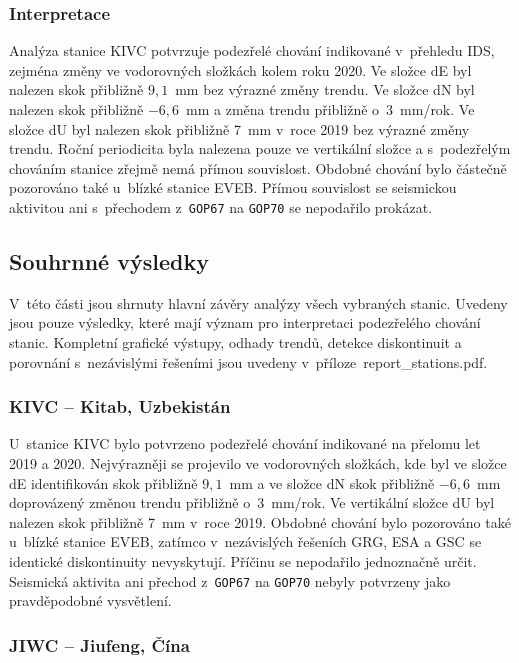 \subsubsection{Interpretace}

Analýza stanice KIVC potvrzuje podezřelé chování indikované v~přehledu IDS, zejména změny ve vodorovných složkách kolem roku 2020. Ve složce dE byl nalezen skok přibližně $9{,}1$~mm bez výrazné změny trendu. Ve složce dN byl nalezen skok přibližně $-6{,}6$~mm a změna trendu přibližně o~3~mm/rok. Ve složce dU byl nalezen skok přibližně 7~mm v~roce 2019 bez výrazné změny trendu. Roční periodicita byla nalezena pouze ve vertikální složce a s~podezřelým chováním stanice zřejmě nemá přímou souvislost. Obdobné chování bylo částečně pozorováno také u~blízké stanice EVEB. Přímou souvislost se seismickou aktivitou ani s~přechodem z~\texttt{GOP67} na \texttt{GOP70} se nepodařilo prokázat.

\subsection{Souhrnné výsledky}
\label{sec:souhrn-casove-rady}

V~této části jsou shrnuty hlavní závěry analýzy všech vybraných stanic. Uvedeny jsou pouze výsledky, které mají význam pro interpretaci podezřelého chování stanic. Kompletní grafické výstupy, odhady trendů, detekce diskontinuit a porovnání s~nezávislými řešeními jsou uvedeny v~příloze~report\_stations.pdf.

\subsubsection{KIVC -- Kitab, Uzbekistán}

U~stanice KIVC bylo potvrzeno podezřelé chování indikované na přelomu let 2019 a 2020. Nejvýrazněji se projevilo ve vodorovných složkách, kde byl ve složce dE identifikován skok přibližně $9{,}1$~mm a ve složce dN skok přibližně \(-6{,}6\)~mm doprovázený změnou trendu přibližně o~3~mm/rok. Ve vertikální složce dU byl nalezen skok přibližně 7~mm v~roce 2019. Obdobné chování bylo pozorováno také u~blízké stanice EVEB, zatímco v~nezávislých řešeních GRG, ESA a GSC se identické diskontinuity nevyskytují. Příčinu se nepodařilo jedno\-značně určit. Seismická aktivita ani přechod z~\texttt{GOP67} na \texttt{GOP70} nebyly potvrzeny jako pravděpodobné vysvětlení.

\subsubsection{JIWC -- Jiufeng, Čína}

